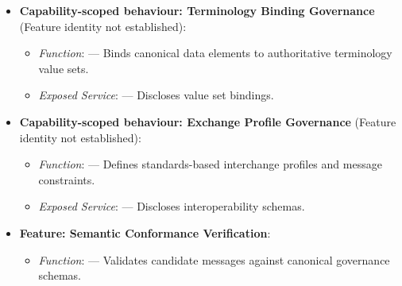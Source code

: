 \begin{itemize}
\begin{itemize}
\begin{itemize}
\item
\emph{Exposed Service}: \texttt{} — Provides data dictionary specifications.



\end{itemize}


\item
\textbf{Capability-scoped behaviour: Terminology Binding Governance} (Feature identity not established):


\begin{itemize}

\item
\emph{Function}: \texttt{} — Binds canonical data elements to authoritative terminology value sets.



\item
\emph{Exposed Service}: \texttt{} — Discloses value set bindings.



\end{itemize}


\item
\textbf{Capability-scoped behaviour: Exchange Profile Governance} (Feature identity not established):


\begin{itemize}

\item
\emph{Function}: \texttt{} — Defines standards-based interchange profiles and message constraints.



\item
\emph{Exposed Service}: \texttt{} — Discloses interoperability schemas.



\end{itemize}


\item
\textbf{Feature: Semantic Conformance Verification}:


\begin{itemize}

\item
\emph{Function}: \texttt{} — Validates candidate messages against canonical governance schemas.




\end{itemize}
\end{itemize}
\end{itemize}
